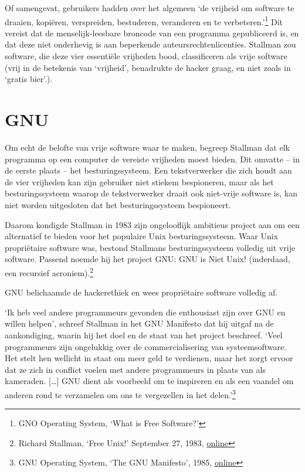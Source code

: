 \documentclass[
  a5paper,
  smalldemyvopaper,11pt,twoside,onecolumn,openright,extrafontsizes]{memoir}
\begin{document}
Of samengevat, gebruikers hadden over het algemeen `de vrijheid om
software te draaien, kopiëren, verspreiden, bestuderen, veranderen en te
verbeteren.'\footnote{\hspace{0pt}GNO Operating System, `What is Free
  Software?'} Dit vereist dat de menselijk-leesbare broncode van een
programma gepubliceerd is, en dat deze niet onderhevig is aan beperkende
auteursrechtenlicenties. Stallman zou software, die deze vier essentiële
vrijheden bood, classificeren als vrije software (vrij in de betekenis
van `vrijheid', benadrukte de hacker graag, en niet zoals in `gratis
bier'.).

\section{GNU}\label{gnu}

Om echt de belofte van vrije software waar te maken, begreep Stallman
dat elk programma op een computer de vereiste vrijheden moest bieden.
Dit omvatte -- in de eerste plaats -- het besturingssysteem. Een
tekstverwerker die zich houdt aan de vier vrijheden kan zijn gebruiker
niet stiekem bespioneren, maar als het besturingssysteem waarop de
tekstverwerker draait ook niet-vrije software is, kan niet worden
uitgesloten dat het besturingssysteem bespioneert.

Daarom kondigde Stallman in 1983 zijn ongelooflijk ambitieus project aan
om een alternatief te bieden voor het populaire Unix besturingssysteem.
Waar Unix propriëtaire software was, bestond Stallmans besturingssysteem
volledig uit vrije software. Passend noemde hij het project GNU: GNU is
Niet Unix! (inderdaad, een recursief acroniem).\footnote{\hspace{0pt}Richard
  Stallman, `Free Unix!' September 27, 1983,
  \href{https://www.gnu.org/gnu/initial-announcement.en.html.}{online}}

GNU belichaamde de hackerethiek en wees propriëtaire software volledig
af.

`Ik heb veel andere programmeurs gevonden die enthousiast zijn over GNU
en willen helpen', schreef Stallman in het GNU Manifesto dat hij uitgaf
na de aankondiging, waarin hij het doel en de staat van het project
beschreef. `Veel programmeurs zijn ongelukkig over de commercialisering
van systeemsoftware. Het stelt hen wellicht in staat om meer geld te
verdienen, maar het zorgt ervoor dat ze zich in conflict voelen met
andere programmeurs in plaats van als kameraden. {[}\ldots{]} GNU dient
als voorbeeld om te inspireren en als een vaandel om anderen rond te
verzamelen om ons te vergezellen in het delen.'\footnote{\hspace{0pt}GNU
  Operating System, `The GNU Manifesto', 1985,
  \href{https://www.gnu.org/gnu/manifesto.html.en}{online}}
\end{document}
